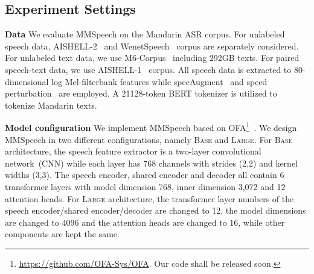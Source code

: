 \documentclass{article}
\begin{document}
\subsection{Experiment Settings}
\textbf{Data}
We evaluate MMSpeech on the Mandarin ASR corpus. For unlabeled speech data, AISHELL-2~\cite{du2018aishell} and WenetSpeech~\cite{zhang2022wenetspeech} corpus are separately considered. For unlabeled text data, we use M6-Corpus~\cite{lin2021m6} including 292GB texts. For paired speech-text data, we use AISHELL-1~\cite{bu2017aishell} corpus. All speech data is extracted to 80-dimensional log Mel-filterbank features while specAugment~\cite{park2019specaugment} and speed perturbation~\cite{ko2017study} are employed. A 21128-token BERT tokenizer\cite{devlin2018bert} is utilized to tokenize Mandarin texts.

\noindent
\textbf{Model configuration}
We implement MMSpeech based on OFA\footnote{\href{https://github.com/OFA-Sys/OFA}{https://github.com/OFA-Sys/OFA}. Our code shall be released soon.}~\cite{wang2022unifying}. We design MMSpeech in two different configurations, namely \textsc{Base} and \textsc{Large}. For \textsc{Base} architecture, the speech feature extractor is a two-layer convolutional network~(CNN) while each layer has 768 channels with strides (2,2) and kernel widths (3,3). The speech encoder, shared encoder and decoder all contain 6 transformer layers with model dimension 768, inner dimension 3,072 and 12 attention heads. For \textsc{Large} architecture, the transformer layer numbers of the speech encoder/shared encoder/decoder are changed to 12, the model dimensions are changed to 4096 and the attention heads are changed to 16, while other components are kept the same. 
\end{document}

